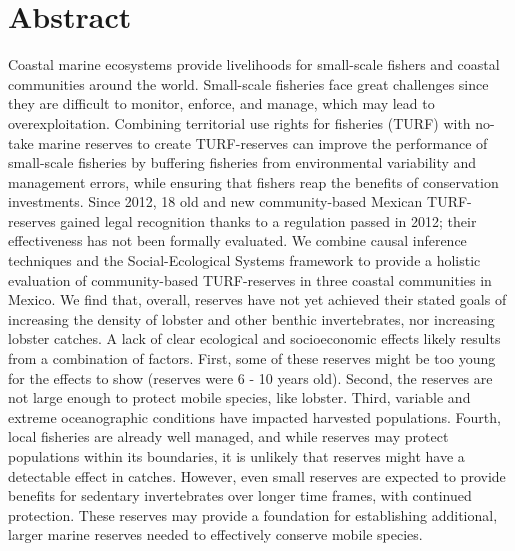 \documentclass[10pt,letterpaper]{article}
\begin{document}
\section*{Abstract}
Coastal marine ecosystems provide livelihoods for small-scale fishers and coastal communities around the world. Small-scale fisheries face great challenges since they are difficult to monitor, enforce, and manage, which may lead to overexploitation. Combining territorial use rights for fisheries (TURF) with no-take marine reserves to create TURF-reserves can improve the performance of small-scale fisheries by buffering fisheries from environmental variability and management errors, while ensuring that fishers reap the benefits of conservation investments. Since 2012, 18 old and new community-based Mexican TURF-reserves gained legal recognition thanks to a regulation passed in 2012; their effectiveness has not been formally evaluated. We combine causal inference techniques and the Social-Ecological Systems framework to provide a holistic evaluation of community-based TURF-reserves in three coastal communities in Mexico. We find that, overall, reserves have not yet achieved their stated goals of increasing the density of lobster and other benthic invertebrates, nor increasing lobster catches. A lack of clear ecological and socioeconomic effects likely results from a combination of factors. First, some of these reserves might be too young for the effects to show (reserves were 6 - 10  years old). Second, the reserves are not large enough to protect mobile species, like lobster. Third, variable and extreme oceanographic conditions have impacted harvested populations. Fourth, local fisheries are already well managed, and while reserves may protect populations within its boundaries, it is unlikely that reserves might have a detectable effect in catches. However, even small reserves are expected to provide benefits for sedentary invertebrates over longer time frames, with continued protection. These reserves may provide a foundation for establishing additional, larger marine reserves needed to effectively conserve mobile species.

\end{document}
